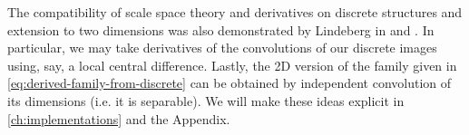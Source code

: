     The compatibility of scale space theory and derivatives on discrete structures and     extension to two dimensions was also demonstrated by Lindeberg in \cite{lindeberg-discrete-derivative} and \cite{lindeberg1998feature}. In particular, we may take derivatives of the convolutions of our discrete images
    using, say, a local central difference.
    Lastly, the 2D version of the family given in \cref{eq:derived-family-from-discrete} can be obtained by independent convolution of its dimensions (i.e. it is separable). We will make these
    ideas explicit in \cref{ch:implementations} and the Appendix.